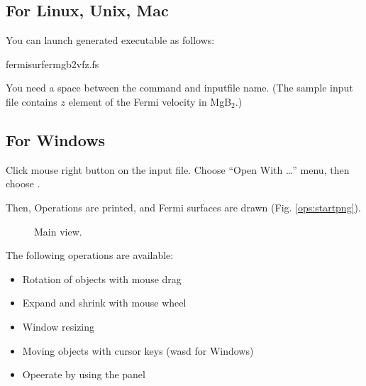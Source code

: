 \documentclass[letterpaper,10pt,pdftex,openany,english]{sphinxmanual}
\let\sphinxpxdimen\pdfpxdimen\else\newdimen\sphinxpxdimen
\begin{document}
\subsection{For Linux, Unix, Mac}
\label{\detokenize{ops:for-linux-unix-mac}}
\sphinxAtStartPar
You can launch generated executable as follows:

\begin{sphinxVerbatim}[commandchars=\\\{\}]
\PYGZdl{}fermisurfermgb2\PYGZus{}vfz.fs
\end{sphinxVerbatim}

\sphinxAtStartPar
You need a space between the command and input\sphinxhyphen{}file name.
(The sample input file  contains \(z\) element of
the Fermi velocity in MgB$_{\text{2}}$.)


\subsection{For Windows}
\label{\detokenize{ops:for-windows}}
\sphinxAtStartPar
Click mouse right button on the input file. Choose “Open With …” menu,
then choose .

\sphinxAtStartPar
Then, Operations are printed, and Fermi surfaces are drawn (Fig. \ref{ops:startpng}).

\begin{figure}[htbp]
\centering
\capstart

\noindent\sphinxincludegraphics[width=500\sphinxpxdimen]{{start}.png}
\caption{Main view.}\label{\detokenize{ops:id1}}\label{\detokenize{ops:startpng}}\end{figure}

\sphinxAtStartPar
The following operations are available:
\begin{itemize}
\item {} 
\sphinxAtStartPar
Rotation of objects with mouse drag

\item {} 
\sphinxAtStartPar
Expand and shrink with mouse wheel

\item {} 
\sphinxAtStartPar
Window re\sphinxhyphen{}sizing

\item {} 
\sphinxAtStartPar
Moving objects with cursor keys (wasd for Windows)

\item {} 
\sphinxAtStartPar
Opeerate by using the panel

\end{itemize}
\end{document}
